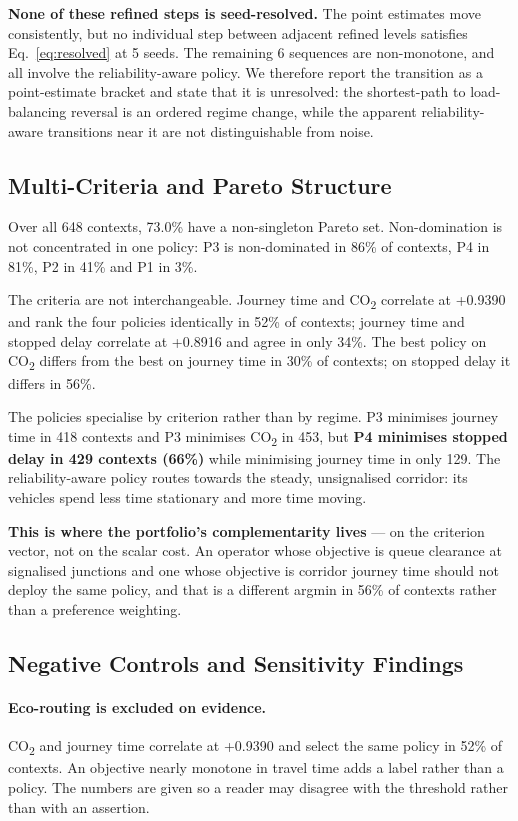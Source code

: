 \documentclass[runningheads]{llncs}
\newcommand{\CO}{CO\textsubscript{2}}
\begin{document}
\textbf{None of these refined steps is seed-resolved.} The point estimates move
consistently, but no individual step between adjacent refined levels satisfies
Eq.~\ref{eq:resolved} at 5 seeds. The remaining 6
sequences are non-monotone, and all involve the reliability-aware policy. We
therefore report the transition as a point-estimate bracket and state that it is
unresolved: the shortest-path to load-balancing reversal is an ordered regime
change, while the apparent reliability-aware transitions near it are not
distinguishable from noise.

\subsection{Multi-Criteria and Pareto Structure}
\label{sec:pareto}

Over all 648 contexts, 73.0\% have a
non-singleton Pareto set. Non-domination is not concentrated in one policy: P3
is non-dominated in 86\% of contexts, P4 in
81\%, P2 in 41\% and P1 in 3\%.

The criteria are not interchangeable. Journey time and \CO{} correlate at
+0.9390 and rank the four policies identically in
52\% of contexts; journey time and stopped delay correlate at
+0.8916 and agree in only 34\%. The best
policy on \CO{} differs from the best on journey time in
30\% of contexts; on stopped delay it differs in
56\%.

The policies specialise by criterion rather than by regime.
P3 minimises journey time in 418 contexts and
P3 minimises \CO{} in 453, but
\textbf{P4 minimises stopped delay in 429
contexts (66\%)} while minimising journey time in only
129. The reliability-aware policy routes towards the steady,
unsignalised corridor: its vehicles spend less time stationary and more time
moving.

\textbf{This is where the portfolio's complementarity lives} --- on the criterion
vector, not on the scalar cost. An operator whose objective is queue clearance
at signalised junctions and one whose objective is corridor journey time should
not deploy the same policy, and that is a different argmin in
56\% of contexts rather than a preference weighting.

\subsection{Negative Controls and Sensitivity Findings}

\paragraph{Eco-routing is excluded on evidence.} \CO{} and journey time
correlate at +0.9390 and select the same policy in
52\% of contexts. An objective nearly monotone in travel time
adds a label rather than a policy. The numbers are given so a reader may
disagree with the threshold rather than with an assertion.
\end{document}
